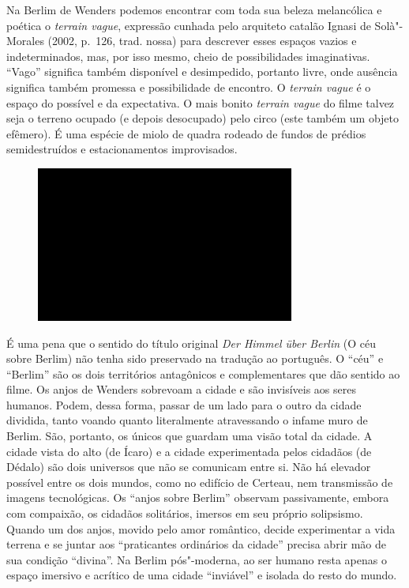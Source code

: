 Na Berlim de Wenders podemos encontrar com toda sua beleza melancólica e
poética o \emph{terrain vague}, expressão cunhada pelo arquiteto catalão
Ignasi de Solà"-Morales (2002, p.~126, trad. nossa) para descrever esses
espaços vazios e indeterminados, mas, por isso mesmo, cheio de
possibilidades imaginativas. ``Vago'' significa também disponível e
desimpedido, portanto livre, onde ausência significa também promessa e
possibilidade de encontro. O \emph{terrain vague} é o espaço do
possível e da expectativa. O mais bonito \emph{terrain vague} do filme
talvez seja o terreno ocupado (e depois desocupado) pelo circo (este
também um objeto efêmero). É uma espécie de miolo de quadra rodeado de
fundos de prédios semidestruídos e estacionamentos improvisados.

\begin{figure}[!ht]
\centering
 \includegraphics[width=85mm]{./imgs/im1.jpg}
\caption{\tiny{}}
\end{figure}

É uma pena que o sentido do título original \emph{Der Himmel über
Berlin} (O céu sobre Berlim) não tenha sido preservado na tradução ao
português. O ``céu'' e ``Berlim'' são os dois territórios antagônicos e
complementares que dão sentido ao filme. Os anjos de Wenders sobrevoam a
cidade e são invisíveis aos seres humanos. Podem, dessa forma, passar de
um lado para o outro da cidade dividida, tanto voando quanto
literalmente atravessando o infame muro de Berlim. São, portanto, os
únicos que guardam uma visão total da cidade. A cidade vista do alto (de
Ícaro) e a cidade experimentada pelos cidadãos (de Dédalo) são dois
universos que não se comunicam entre si. Não há elevador possível entre
os dois mundos, como no edifício de Certeau, nem transmissão de imagens
tecnológicas. Os ``anjos sobre Berlim'' observam passivamente, embora
com compaixão, os cidadãos solitários, imersos em seu próprio
solipsismo. Quando um dos anjos, movido pelo amor romântico, decide
experimentar a vida terrena e se juntar aos ``praticantes ordinários da
cidade'' precisa abrir mão de sua condição ``divina''. Na Berlim
pós"-moderna, ao ser humano resta apenas o espaço imersivo e acrítico de
uma cidade ``inviável'' e isolada do resto do mundo.

